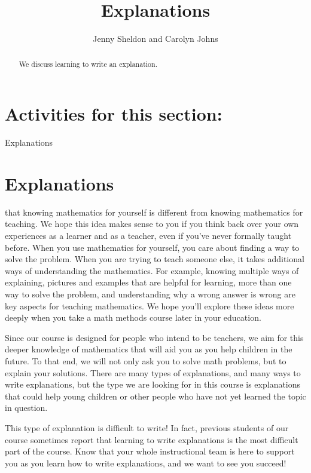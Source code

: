 \documentclass[noauthor,nooutcomes]{ximera}
\title{Explanations}
\author{Jenny Sheldon and Carolyn Johns}
\begin{document}
\begin{abstract}
We discuss learning to write an explanation.
\end{abstract}
\maketitle

\section{Activities for this section:} Explanations


\section{Explanations}



  that knowing mathematics for yourself is different from knowing mathematics for teaching. We hope this idea makes sense to you if you think back over your own experiences as a learner and as a teacher, even if you've never formally taught before. When you use mathematics for yourself, you care about finding a way to solve the problem. When you are trying to teach someone else, it takes additional ways of understanding the mathematics. For example, knowing multiple ways of explaining, pictures and examples that are helpful for learning, more than one way to solve the problem, and understanding why a wrong answer is wrong are key aspects for teaching mathematics. We hope you'll explore these ideas more deeply when you take a math methods course later in your education.

Since our course is designed for people who intend to be teachers, we aim for this deeper knowledge of mathematics that will aid you as you help children in the future. To that end, we will not only ask you to solve math problems, but to explain your solutions. There are many types of explanations, and many ways to write explanations, but the type we are looking for in this course is explanations that could help young children or other people who have not yet learned the topic in question.

This type of explanation is difficult to write! In fact, previous students of our course sometimes report that learning to write explanations is the most difficult part of the course. Know that your whole instructional team is here to support you as you learn how to write explanations, and we want to see you succeed!
\end{document}

